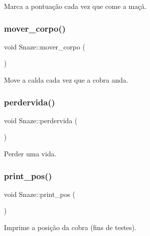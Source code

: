 Marca a pontuação cada vez que come a maçã. 

\mbox{\label{classSnaze_ade218832f4a4a1e69a6893f1cf2fea0e}} 
\subsubsection{\texorpdfstring{mover\+\_\+corpo()}{mover\_corpo()}}
{\footnotesize\ttfamily void Snaze\+::mover\+\_\+corpo (\begin{DoxyParamCaption}{ }\end{DoxyParamCaption})\hspace{0.3cm}{\ttfamily [inline]}}



Move a calda cada vez que a cobra anda. 

\mbox{\label{classSnaze_afd115b41dab7febbfbf56f7cbf207479}} 
\subsubsection{\texorpdfstring{perdervida()}{perdervida()}}
{\footnotesize\ttfamily void Snaze\+::perdervida (\begin{DoxyParamCaption}{ }\end{DoxyParamCaption})\hspace{0.3cm}{\ttfamily [inline]}}



Perder uma vida. 

\mbox{\label{classSnaze_af621f316459a63cc4db4b55d577fe2ef}} 
\subsubsection{\texorpdfstring{print\+\_\+pos()}{print\_pos()}}
{\footnotesize\ttfamily void Snaze\+::print\+\_\+pos (\begin{DoxyParamCaption}{ }\end{DoxyParamCaption})\hspace{0.3cm}{\ttfamily [inline]}}



Imprime a posição da cobra (fins de testes). 

